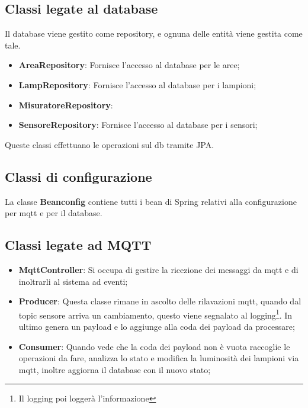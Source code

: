 \subsection{Classi legate al database}

Il database viene gestito come repository, e ognuna delle entità viene gestita come tale.

\begin{itemize}
    \item \textbf{AreaRepository}: Fornisce l'accesso al database per le aree;
    \item \textbf{LampRepository}: Fornisce l'accesso al database per i lampioni;
    \item \textbf{MisuratoreRepository}: 
    \item \textbf{SensoreRepository}: Fornisce l'accesso al database per i sensori;
\end{itemize}

Queste classi effettuano le operazioni sul db tramite JPA.

\subsection{Classi di configurazione}

La classe \textbf{Beanconfig} contiene tutti i bean di Spring relativi alla configurazione per mqtt e per il database.

\subsection{Classi legate ad MQTT}

\begin{itemize}
    \item \textbf{MqttController}: Si occupa di gestire la ricezione dei messaggi da mqtt e di inoltrarli al sistema ad eventi;
    \item \textbf{Producer}: Questa classe rimane in ascolto delle rilavazioni mqtt, quando dal topic sensore arriva un cambiamento, questo viene segnalato al logging\footnote{Il logging poi loggerà l'informazione}. In ultimo genera un payload e lo aggiunge alla coda dei payload da processare;
    \item \textbf{Consumer}: Quando vede che la coda dei payload non è vuota raccoglie le operazioni da fare, analizza lo stato e modifica la luminosità dei lampioni via mqtt, inoltre aggiorna il database con il nuovo stato;
\end{itemize}

